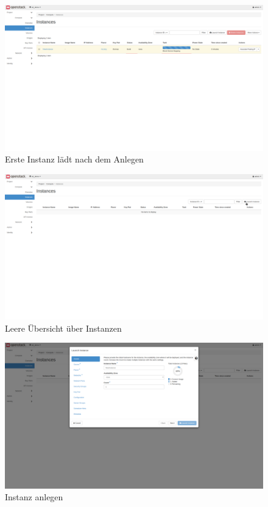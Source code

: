 \documentclass[a4paper,10pt]{article}
\begin{document}
\begin{figure}[htbp]
\centering
\caption{Erste Instanz lädt nach dem Anlegen}
\label{fig:devstack:loading_instance}
\includegraphics[width=\textwidth, trim={0 17cm 0 0}, clip]{graphics/devstack/11_LaunchInstanceAlternative}
\end{figure}

\begin{figure}[htbp]
\centering
\caption{Leere Übersicht über Instanzen}
\label{fig:devstack:empty_instance}
\includegraphics[width=\textwidth, trim={0 17cm 0 0}, clip]{graphics/devstack/05_InstancesEmpty}
\end{figure}

\begin{figure}[htbp]
\centering
\caption{Instanz anlegen}
\label{fig:devstack:launch_instance}
\includegraphics[width=\textwidth, trim={0 10cm 0 0}, clip]{graphics/devstack/06a_LaunchInstance}
\end{figure}
\end{document}
